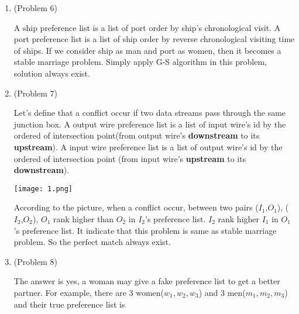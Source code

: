 \normalfont\documentclass[letterpaper,11pt]{article}
\begin{document}
\setlength{\parindent}{2ex}
\newcommand{\header}{
	\noindent {}
}

\bigskip
\header

\begin{enumerate}
\item (Problem 6)\par
	A ship preference list is a list of port order by ship's chronological visit. A port preference list is a list of ship order by reverse chronological visiting time of ships. If we consider ship as man and port as women, then it becomes a stable marriage problem. Simply apply G-S algorithm in this problem, solution always exist. 
\item (Problem 7)\par
	Let's define that a conflict occur if two data streams pass through the same junction box. A output wire preference list is a list of input wire's id by the ordered of intersection point(from output wire's \textbf{downstream} to its \textbf{upstream}). A input wire preference list is a list of output wire's id by the ordered of intersection point (from input wire's \textbf{upstream} to its \textbf{downstream}).\par
	\texttt{[image: 1.png]}\par
	According to the picture, when a conflict occur, between two pairs ($I_1$,$O_1$), ($I_2$,$O_2$), $O_1$ rank higher than $O_2$ in $I_2$'s preference list. $I_2$ rank higher $I_1$ in $O_1$'s preference list. It indicate that this problem is same as stable marriage problem. So the perfect match always exist.
\item (Problem 8)\par
	The answer is yes, a woman may give a fake preference list to get a better partner. For example, there are 3 women($w_1,w_2,w_3$) and 3 men($m_1,m_2,m_3$) and their true preference list is \par


\end{enumerate}
\end{document}
